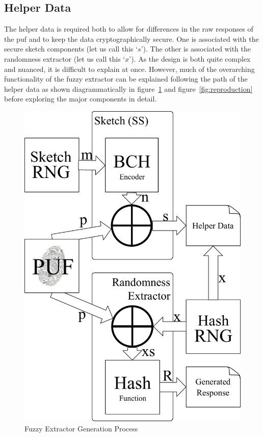 \subsection{Helper Data}
The helper data is required both to allow for differences in the raw responses
of the \gls{puf} and to keep the data cryptographically secure. One is associated
with the secure sketch components (let us call this `$s$'). The other is associated
with the randomness extractor (let us call this `$x$').
As the design is both quite complex and nuanced, it is difficult to explain at
once. However, much of the overarching
functionality of the fuzzy extractor can be explained following the path of the
helper data as shown diagrammatically in figure~\ref{fig:generation}
and figure~\ref{fig:reproduction}
 before exploring the major components in detail.

\begin{figure}
  \centering
  \includegraphics[scale=0.7]{images/generation}
  \caption{Fuzzy Extractor Generation Process}
  \label{fig:generation}
\end{figure}

